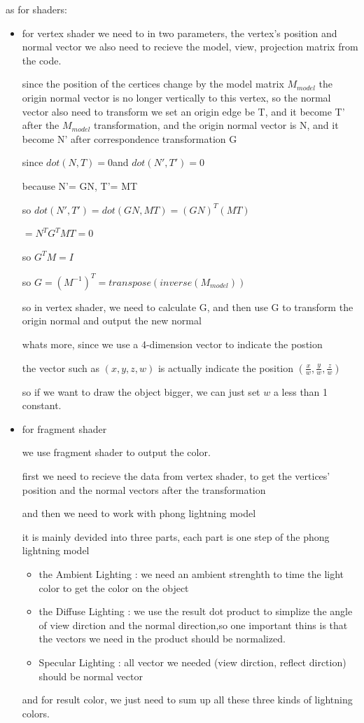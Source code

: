 \documentclass[acmtog]{acmart}
\begin{document}
as for shaders:
\begin{itemize}
\item for vertex shader
we need to in two parameters, the vertex's position and normal vector
we also need to recieve the model, view, projection matrix from the code.

since the position of the certices change by the model matrix \(M_{model}\)
the origin normal vector is no longer vertically to this vertex,
so the normal vector also need to transform
we set an origin edge be T, and it become T' after the \(M_{model}\) transformation,
and the origin normal vector is N, and it become N' after correspondence transformation G

since \(dot(N,T)=0\)and \(dot(N',T')=0\) 

because N'= GN, T'= MT

so  \(dot(N',T')=dot(GN,MT)=(GN)^T(MT)\)

\(=N^TG^TMT=0\)

so  \(G^TM=I\)

so  \(G=(M^{-1})^T=transpose(inverse(M_{model}))\)

so in vertex shader, we need to calculate G, and then use G to transform the origin normal and output the new normal

whats more, since we use a 4-dimension vector to indicate the postion

the vector such as \((x,y,z,w)\) is actually indicate the position \((\frac{x}{w},\frac{y}{w},\frac{z}{w})\)

so if we want to draw the object bigger, we can just set \(w\) a less than 1 constant.


\item for fragment shader

we use fragment shader to output the color.

first we need to recieve the data from vertex shader, to get the vertices' position
and the normal vectors after the transformation

and then we need to work with phong lightning model

it is mainly devided into three parts, each part is one step of the phong lightning model

\begin{itemize}
\item the Ambient Lighting : we need an ambient strenghth to time the light color to get the color on the object
\item the Diffuse Lighting : we use the result dot product to simplize the angle of view dirction and the normal direction,so one important thins is that the vectors we need in the product should be normalized.  
\item Specular Lighting : all vector we needed (view dirction, reflect dirction) should be normal vector
\end{itemize}

and for result color, we just need to sum up all these three kinds of lightning colors.

\end{itemize}
	
\end{document}
